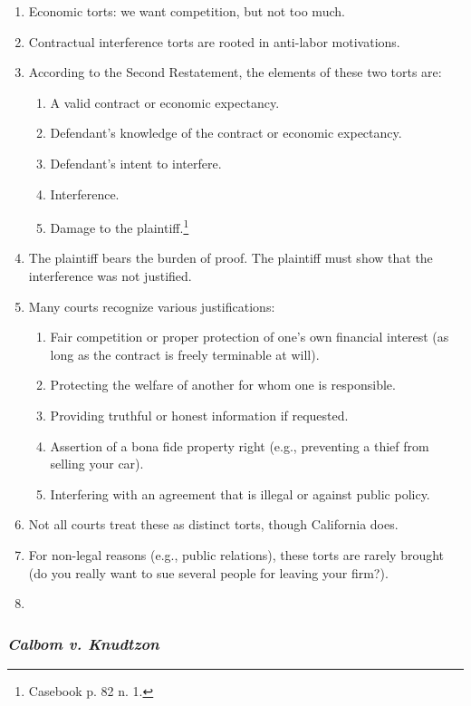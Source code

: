 \begin{enumerate}
    \item Economic torts: we want competition, but not too much.
    \item Contractual interference torts are rooted in anti-labor motivations.
    \item According to the Second Restatement, the elements of these two torts 
    are:
    \begin{enumerate}
        \item A valid contract or economic expectancy.
        \item Defendant's knowledge of the contract or economic expectancy.
        \item Defendant's intent to interfere.
        \item Interference.
        \item Damage to the plaintiff.\footnote{Casebook p. 82 n. 1.}
    \end{enumerate}
    \item The plaintiff bears the burden of proof. The plaintiff must show 
    that the interference was not justified.
    \item Many courts recognize various justifications:
    \begin{enumerate}
        \item Fair competition or proper protection of one's own financial 
        interest (as long as the contract is freely terminable at will).
        \item Protecting the welfare of another for whom one is responsible.
        \item Providing truthful or honest information if requested.
        \item Assertion of a bona fide property right (e.g., preventing a 
        thief from selling your car).
        \item Interfering with an agreement that is illegal or against public 
        policy.
    \end{enumerate}
    \item Not all courts treat these as distinct torts, though California 
    does.
    \item For non-legal reasons (e.g., public relations), these torts are 
    rarely brought (do you really want to sue several people for leaving your 
    firm?).
    \item \end{enumerate}

\subsubsection{\emph{Calbom v. Knudtzon}}

